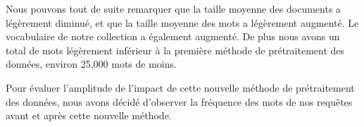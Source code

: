 \documentclass[a4paper, 12pt]{article}
\begin{document}
\begin{table}[!h]
  \begin{minipage}{0.35\linewidth}
      \centering
      \caption{Statistiques de la collection}
  \end{minipage}%
  \hspace{0.05\linewidth} %
  \begin{minipage}{0.60\linewidth}
    Nous pouvons tout de suite remarquer que la taille moyenne des documents a légèrement diminué, 
    et que la taille moyenne des mots a légèrement augmenté. Le vocabulaire de notre collection a également
    augmenté. De plus nous avons un total de mots légèrement inférieur à la première méthode de prétraitement des données, 
    environ 25,000 mots de moins.    
  \end{minipage}
\end{table}

Pour évaluer l'amplitude de l'impact de cette nouvelle méthode de prétraitement des données, 
nous avons décidé d'observer la fréquence des mots de nos requêtes avant et après cette nouvelle méthode.

\begin{table}[!h]
    \centering
    \caption{Fréquence des mots des requêtes (Partie 1)}
\end{table}
\end{document}
